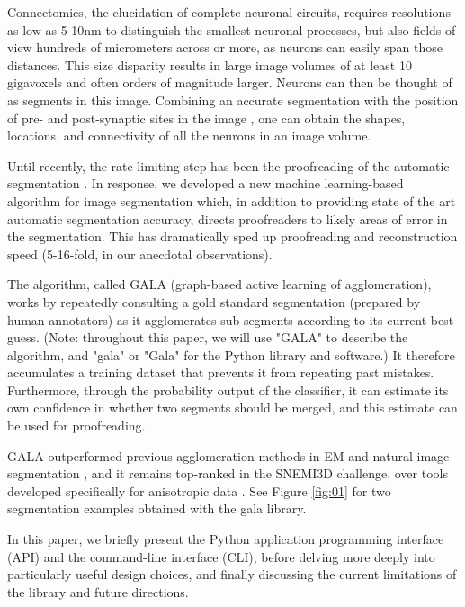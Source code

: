 \documentclass{frontiersSCNS} %
\begin{document}
Connectomics, the elucidation of complete neuronal circuits, requires resolutions as low as 5-10nm to distinguish the smallest neuronal processes, but also fields of view hundreds of micrometers across or more, as neurons can easily span those distances.
This size disparity results in large image volumes of at least 10 gigavoxels and often orders of magnitude larger.
Neurons can then be thought of as segments in this image.
Combining an accurate segmentation with the position of pre- and post-synaptic sites in the image \citep{Kreshuk:2011el, Jagadeesh:2013wn}, one can obtain the shapes, locations, and connectivity of all the neurons in an image volume.

Until recently, the rate-limiting step has been the proofreading of the automatic segmentation  \citep{Chklovskii:2010df}.
In response, we developed a new machine learning-based algorithm for image segmentation \citep{NunezIglesias:2013cd} which, in addition to providing state of the art automatic segmentation accuracy, directs proofreaders to likely areas of error in the segmentation.
This has dramatically sped up proofreading and reconstruction speed (5-16-fold, in our anecdotal observations).

The algorithm, called GALA (graph-based active learning of agglomeration), works by repeatedly consulting a gold standard segmentation (prepared by human annotators) as it agglomerates sub-segments according to its current best guess.
(Note: throughout this paper, we will use "GALA" to describe the algorithm, and "gala" or "Gala" for the Python library and software.)
It therefore accumulates a training dataset that prevents it from repeating past mistakes.
Furthermore, through the probability output of the classifier, it can estimate its own confidence in whether two segments should be merged, and this estimate can be used for proofreading.

GALA outperformed previous agglomeration methods in EM and natural image segmentation \citep{NunezIglesias:2013cd}, and it remains top-ranked in the SNEMI3D challenge, over tools developed specifically for anisotropic data \citep{snemi, Liu:2012ba, Kaynig:2013tv}.
See Figure \ref{fig:01} for two segmentation examples obtained with the gala library.

In this paper, we briefly present the Python application programming interface (API) and the command-line interface (CLI), before delving more deeply into particularly useful design choices, and finally discussing the current limitations of the library and future directions.
\end{document}
